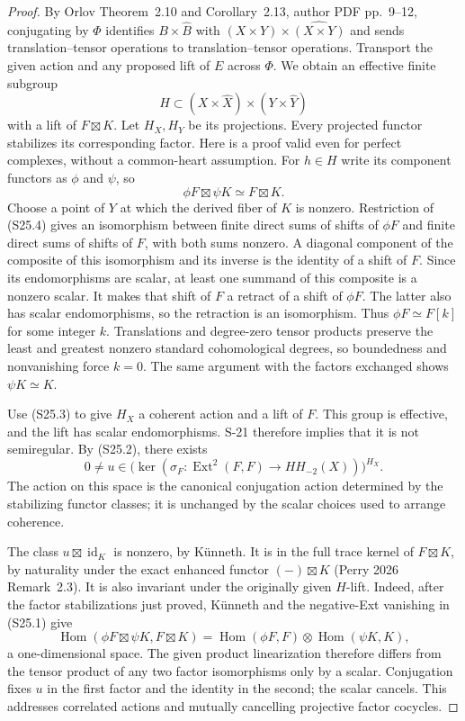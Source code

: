 \begin{proof}
By Orlov Theorem~2.10 and Corollary~2.13, author PDF
pp.~9--12, conjugating by $\Phi$ identifies
$B\times\widehat B$ with
$(X\times Y)\times\widehat{(X\times Y)}$ and sends
translation--tensor operations to translation--tensor
operations. Transport the given action and any proposed
lift of $E$ across $\Phi$. We obtain an effective finite
subgroup
\[
 H\subset (X\times\widehat X)\times(Y\times\widehat Y)
\]
with a lift of $F\boxtimes K$. Let $H_X,H_Y$ be its
projections. Every projected functor stabilizes its
corresponding factor. Here is a proof valid even for
perfect complexes, without a common-heart assumption.
For $h\in H$ write its component functors as $\phi$ and
$\psi$, so
\[
 \phi F\boxtimes\psi K\simeq F\boxtimes K.
 \tag{S25.4}
\]
Choose a point of $Y$ at which the derived fiber of $K$
is nonzero. Restriction of (S25.4) gives an isomorphism
between finite direct sums of shifts of $\phi F$ and
finite direct sums of shifts of $F$, with both sums
nonzero. A diagonal component of the composite of this
isomorphism and its inverse is the identity of a shift
of $F$. Since its endomorphisms are scalar, at least one
summand of this composite is a nonzero scalar. It makes
that shift of $F$ a retract of a shift of $\phi F$.
The latter also has scalar endomorphisms, so the retraction
is an isomorphism. Thus $\phi F\simeq F[k]$ for some
integer $k$. Translations and degree-zero tensor products
preserve the least and greatest nonzero standard
cohomological degrees, so boundedness and nonvanishing
force $k=0$. The same argument with the factors exchanged
shows $\psi K\simeq K$.

Use (S25.3) to give $H_X$ a coherent action and a lift of
$F$. This group is effective, and the lift has scalar
endomorphisms. S-21 therefore implies that it is not
semiregular. By (S25.2), there exists
\[
 0\ne u\in
 \bigl(\ker(\sigma_F:\operatorname{Ext}^2(F,F)
                         \to HH_{-2}(X))\bigr)^{H_X}.
 \tag{S25.5}
\]
The action on this space is the canonical conjugation
action determined by the stabilizing functor classes;
it is unchanged by the scalar choices used to arrange
coherence.

The class $u\boxtimes\operatorname{id}_K$ is nonzero,
by K\"unneth. It is in the full trace kernel of
$F\boxtimes K$, by naturality under the exact enhanced
functor $(-)\boxtimes K$ (Perry 2026 Remark~2.3).
It is also invariant under the originally given $H$-lift.
Indeed, after the factor stabilizations just proved,
K\"unneth and the negative-Ext vanishing in (S25.1) give
\[
 \operatorname{Hom}(\phi F\boxtimes\psi K,F\boxtimes K)
  =\operatorname{Hom}(\phi F,F)\otimes
       \operatorname{Hom}(\psi K,K),
\]
a one-dimensional space. The given product linearization
therefore differs from the tensor product of any two
factor isomorphisms only by a scalar. Conjugation fixes
$u$ in the first factor and the identity in the second;
the scalar cancels. This addresses correlated actions
and mutually cancelling projective factor cocycles.


\end{proof}
